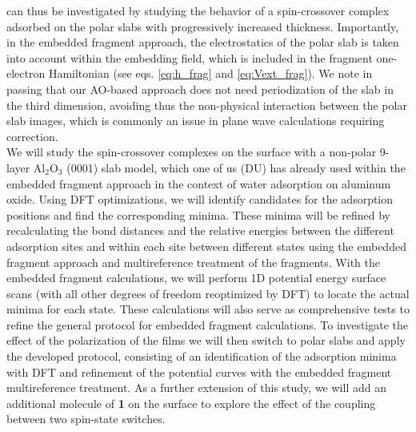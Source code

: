 \documentclass[a4paper,11pt,headings=normal]{scrartcl}
\begin{document}
can thus be investigated by studying the behavior of a spin-crossover complex 
adsorbed on the polar slabs with progressively increased thickness. 
Importantly, in the embedded fragment approach, the electrostatics of the polar 
slab is taken into account within the embedding field, which is included in the 
fragment one-electron Hamiltonian (see eqs. \eqref{eq:h_frag} and 
\eqref{eq:Vext_frag}). We note in passing that our AO-based approach does not 
need periodization of the slab in the third dimension, avoiding thus the 
non-physical interaction between the polar slab images, which is commonly an 
issue in plane wave calculations requiring correction.\\
We will study the spin-crossover complexes on the surface with a 
non-polar 9-layer Al$_2$O$_3$ (0001) slab model, which one of us (DU) has 
already used within the embedded fragment approach in the context of water 
adsorption on aluminum oxide.\autocite{lmp2_al2o3, mullan21} Using DFT 
optimizations, we will identify candidates for the adsorption positions and 
find the corresponding minima. These minima will be refined by recalculating the 
bond distances and the relative energies between the different adsorption sites 
and within each site between different states using the embedded fragment 
approach and multireference treatment of the fragments. With the embedded 
fragment calculations, we will perform 1D potential energy surface scans (with 
all other degrees of freedom reoptimized by DFT) to locate the actual minima 
for each state. These calculations will also serve as comprehensive tests to 
refine the general protocol for embedded fragment calculations.
To investigate the effect of the polarization of the films we will 
then switch to polar slabs and apply the developed protocol, consisting of an 
identification of the adsorption minima with DFT and refinement of the 
potential curves with the embedded fragment multireference treatment. As a
further extension of this study, we will add an additional molecule of 
\textbf{1} on the surface to explore the effect of the coupling between two 
spin-state switches.\\ 
\end{document}

